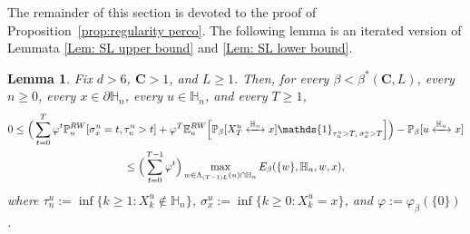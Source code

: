 \documentclass[11pt,a4paper]{article}
\numberwithin{equation}{section}
\theoremstyle{plain}
\newtheorem{Lem}[Thm]{Lemma}
\theoremstyle{definition}
\newcommand\bfC{\mathbf{C}}
\newcommand{\connect}{\xleftrightarrow}
\begin{document}
The remainder of this section is devoted to the proof of Proposition~\ref{prop:regularity perco}. The following lemma is an iterated version of Lemmata \ref{Lem: SL upper bound} and \ref{Lem: SL lower bound}.


\begin{Lem}\label{lem: iteration of SL} Fix $d>6$, $\bfC>1$, and $L\geq 1$. Then, for every $\beta<\beta^*(\bfC,L)$, every $n\geq 0$, every $x\in \partial \mathbb H_n$, every $u \in \mathbb H_n$, and every $T\geq 1$,
\begin{multline}
	0\leq \Big(\sum_{t=0}^{T}\varphi^t\mathbb P^{\rm RW}_{u}[\sigma^u_x=t, \tau_n^u>t]+\varphi^T\mathbb E^{\rm RW}_{u}\Big[\mathbb P_\beta[X_T^u\connect{\mathbb H_n\:}x]\mathds{1}_{\tau_n^u>T, \: \sigma^u_x>T}\Big]\Big)-\mathbb P_\beta[u\connect{\mathbb H_n\:}x]\\
	\leq \Big(\sum_{t=0}^{T-1}\varphi^t\Big)\max_{w\in \Lambda_{(T-1)L}(u)\cap \mathbb H_n}E_\beta(\{w\},\mathbb H_n,w,x),
\end{multline}
where $\tau_n^u:=\inf\{k\geq 1 : X_k^u \notin \mathbb H_n\}$, $\sigma_x^u:=\inf\{k\geq 0: X_k^u=x\}$, and $\varphi:=\varphi_\beta(\{0\})$.
\end{Lem}
\end{document}
